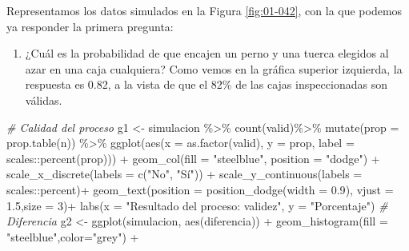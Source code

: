 \documentclass[
]{book}
\newenvironment{Shaded}{\begin{snugshade}}{\end{snugshade}}
\newcommand{\AttributeTok}[1]{\textcolor[rgb]{0.77,0.63,0.00}{#1}}
\newcommand{\CommentTok}[1]{\textcolor[rgb]{0.56,0.35,0.01}{\textit{#1}}}
\newcommand{\DecValTok}[1]{\textcolor[rgb]{0.00,0.00,0.81}{#1}}
\newcommand{\FloatTok}[1]{\textcolor[rgb]{0.00,0.00,0.81}{#1}}
\newcommand{\FunctionTok}[1]{\textcolor[rgb]{0.00,0.00,0.00}{#1}}
\newcommand{\NormalTok}[1]{#1}
\newcommand{\OtherTok}[1]{\textcolor[rgb]{0.56,0.35,0.01}{#1}}
\newcommand{\SpecialCharTok}[1]{\textcolor[rgb]{0.00,0.00,0.00}{#1}}
\newcommand{\StringTok}[1]{\textcolor[rgb]{0.31,0.60,0.02}{#1}}
\providecommand{\tightlist}{%
  \setlength{\itemsep}{0pt}\setlength{\parskip}{0pt}}
\theoremstyle{definition}
\theoremstyle{definition}
\theoremstyle{definition}
\theoremstyle{definition}
\theoremstyle{remark}
\begin{document}
Representamos los datos simulados en la Figura \ref{fig:01-042}, con la que podemos ya responder la primera pregunta:

\begin{enumerate}
\def\labelenumi{\arabic{enumi}.}
\tightlist
\item
  ¿Cuál es la probabilidad de que encajen un perno y una tuerca elegidos al azar en una caja cualquiera? Como vemos en la gráfica superior izquierda, la respuesta es 0.82, a la vista de que el 82\% de las cajas inspeccionadas son válidas.
\end{enumerate}

\begin{Shaded}
\begin{Highlighting}[]
\CommentTok{\# Calidad del proceso}
\NormalTok{g1 }\OtherTok{\textless{}{-}}\NormalTok{ simulacion }\SpecialCharTok{\%\textgreater{}\%}
  \FunctionTok{count}\NormalTok{(valid)}\SpecialCharTok{\%\textgreater{}\%}
  \FunctionTok{mutate}\NormalTok{(}\AttributeTok{prop =} \FunctionTok{prop.table}\NormalTok{(n)) }\SpecialCharTok{\%\textgreater{}\%}
  \FunctionTok{ggplot}\NormalTok{(}\FunctionTok{aes}\NormalTok{(}\AttributeTok{x =} \FunctionTok{as.factor}\NormalTok{(valid), }\AttributeTok{y =}\NormalTok{ prop, }\AttributeTok{label =}\NormalTok{ scales}\SpecialCharTok{::}\FunctionTok{percent}\NormalTok{(prop))) }\SpecialCharTok{+} 
  \FunctionTok{geom\_col}\NormalTok{(}\AttributeTok{fill =} \StringTok{"steelblue"}\NormalTok{, }\AttributeTok{position =} \StringTok{"dodge"}\NormalTok{) }\SpecialCharTok{+}
  \FunctionTok{scale\_x\_discrete}\NormalTok{(}\AttributeTok{labels =} \FunctionTok{c}\NormalTok{(}\StringTok{"No"}\NormalTok{, }\StringTok{"Sí"}\NormalTok{)) }\SpecialCharTok{+}
  \FunctionTok{scale\_y\_continuous}\NormalTok{(}\AttributeTok{labels =}\NormalTok{ scales}\SpecialCharTok{::}\NormalTok{percent)}\SpecialCharTok{+}
  \FunctionTok{geom\_text}\NormalTok{(}\AttributeTok{position =} \FunctionTok{position\_dodge}\NormalTok{(}\AttributeTok{width =} \FloatTok{0.9}\NormalTok{), }\AttributeTok{vjust =} \FloatTok{1.5}\NormalTok{,}\AttributeTok{size =} \DecValTok{3}\NormalTok{)}\SpecialCharTok{+}
  \FunctionTok{labs}\NormalTok{(}\AttributeTok{x =} \StringTok{"Resultado del proceso: validez"}\NormalTok{, }\AttributeTok{y =} \StringTok{"Porcentaje"}\NormalTok{)}
\CommentTok{\# Diferencia}
\NormalTok{g2 }\OtherTok{\textless{}{-}} \FunctionTok{ggplot}\NormalTok{(simulacion, }\FunctionTok{aes}\NormalTok{(diferencia)) }\SpecialCharTok{+} 
  \FunctionTok{geom\_histogram}\NormalTok{(}\AttributeTok{fill =} \StringTok{"steelblue"}\NormalTok{,}\AttributeTok{color=}\StringTok{"grey"}\NormalTok{) }\SpecialCharTok{+}

\end{Highlighting}
\end{Shaded}
\end{document}
